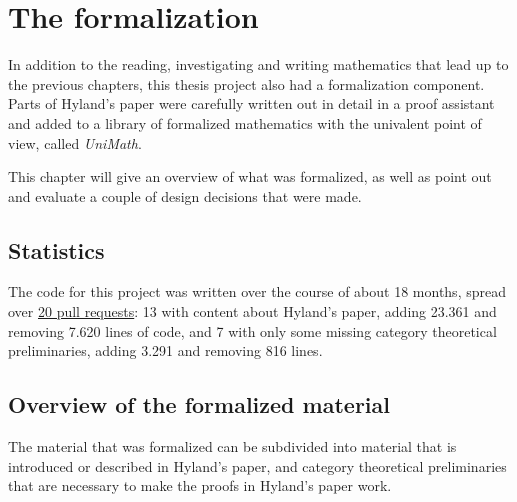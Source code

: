 

\chapter{The formalization}
In addition to the reading, investigating and writing mathematics that lead up to the previous chapters, this thesis project also had a formalization component. Parts of Hyland's paper were carefully written out in detail in a proof assistant and added to a library of formalized mathematics with the univalent point of view, called \textit{UniMath}.

This chapter will give an overview of what was formalized, as well as point out and evaluate a couple of design decisions that were made.

\section{Statistics}

The code for this project was written over the course of about 18 months, spread over \href{https://github.com/UniMath/UniMath/pulls?q=is%3Apr+author%3Aarnoudvanderleer+is%3Aclosed}{20 pull requests}: 13 with content about Hyland's paper, adding 23.361 and removing 7.620 lines of code, and 7 with only some missing category theoretical preliminaries, adding 3.291 and removing 816 lines.

\section{Overview of the formalized material}
The material that was formalized can be subdivided into material that is introduced or described in Hyland's paper, and category theoretical preliminaries that are necessary to make the proofs in Hyland's paper work.

